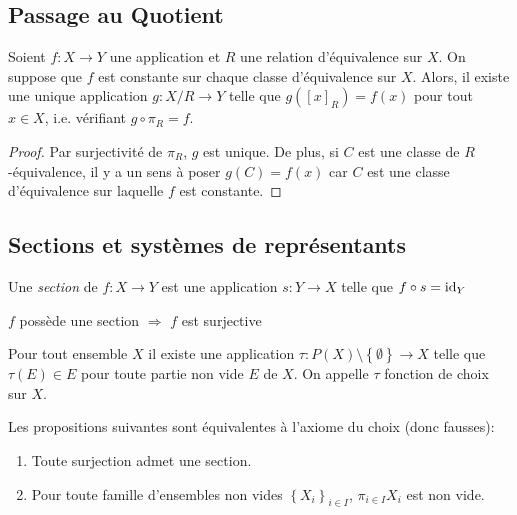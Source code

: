 \documentclass{cours}
\begin{document}
\subsection{Passage au Quotient}
\begin{theorem}\label{proprietequotient}
    Soient $f : X \rightarrow Y$ une application et $R$ une relation d'équivalence sur $X$. On suppose que $f$ est constante sur chaque classe d'équivalence sur $X$. Alors, il existe une unique application $g : X/R \rightarrow Y$ telle que $g\left(\left[x\right]_{R}\right) = f(x)$ pour tout $x \in X$, i.e. vérifiant $g \circ \pi_{R} = f$.
\end{theorem}
\begin{proof}
    Par surjectivité de $\pi_{R}$, $g$ est unique. De plus, si $C$ est une classe de $R$-équivalence, il y a un sens à poser $g(C) = f(x)$ car $C$ est une classe d'équivalence sur laquelle $f$ est constante.
\end{proof}

\subsection{Sections et systèmes de représentants}
\begin{definition}
    Une \emph{section} de $f : X \rightarrow Y$ est une application $s : Y \rightarrow X$ telle que $f \circ s = \textmd{id}_{Y}$
\end{definition}
\begin{proposition}
    $f$ possède une section $\Rightarrow$ $f$ est surjective
\end{proposition}

\begin{definition}\label{AC}
    Pour tout ensemble $X$ il existe une application $\tau : P(X) \setminus \left\{\emptyset\right\} \rightarrow X$ telle que $\tau(E) \in E$ pour toute partie non vide $E$ de $X$. On appelle $\tau$ fonction de choix sur $X$. 
\end{definition}

\begin{proposition}
    Les propositions suivantes sont équivalentes à l'axiome du choix (donc fausses): 
    \begin{enumerate}
        \item Toute surjection admet une section.
        \item Pour toute famille d'ensembles non vides $\left\{X_{i}\right\}_{i\in I}$, $\pi_{i\in I}X_{i}$ est non vide.
    \end{enumerate}
\end{proposition}
\end{document}
